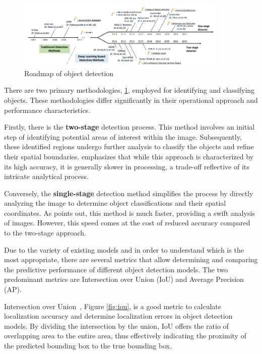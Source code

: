 \begin{figure}[h]
    \centering 
    \includegraphics[width=0.9\textwidth]{figs/roadmap-stage.png} 
    \caption{Roadmap of object detection~\cite{rfc22}}
    \label{fig:stage-detectors}
\end{figure}

There are two primary methodologies, \ref{fig:stage-detectors}, employed for identifying and classifying objects. These methodologies differ significantly in their operational approach and performance characteristics.

Firstly, there is the \textbf{two-stage} detection process. This method involves an initial step of identifying potential areas of interest within the image. Subsequently, these identified regions undergo further analysis to classify the objects and refine their spatial boundaries. \cite{rfc21} emphasizes that while this approach is characterized by its high accuracy, it is generally slower in processing, a trade-off reflective of its intricate analytical process.

Conversely, the \textbf{single-stage} detection method simplifies the process by directly analyzing the image to determine object classifications and their spatial coordinates. As \cite{rfc21} points out, this method is much faster, providing a swift analysis of images. However, this speed comes at the cost of reduced accuracy compared to the two-stage approach.

Due to the variety of existing models and in order to understand which is the most appropriate, there are several metrics that allow determining and comparing the predictive performance of different object detection models. The two predominant metrics are Intersection over Union (IoU) and Average Precision (AP).

Intersection over Union~\cite{rfc14}, Figure \ref{fig:iou}, is a good metric to calculate localization accuracy and determine localization errors in object detection models. By dividing the intersection by the union, IoU offers the ratio of overlapping area to the entire area, thus effectively indicating the proximity of the predicted bounding box to the true bounding box.

